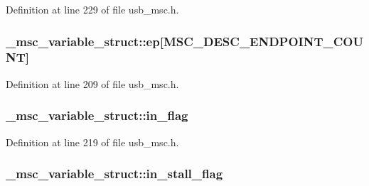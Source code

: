 Definition at line 229 of file usb\+\_\+msc.\+h.

\subsubsection[{\texorpdfstring{ep}{ep}}]{ \+\_\+msc\+\_\+variable\+\_\+struct\+::ep\mbox{[}{\bf M\+S\+C\+\_\+\+D\+E\+S\+C\+\_\+\+E\+N\+D\+P\+O\+I\+N\+T\+\_\+\+C\+O\+U\+NT}\mbox{]}}\hypertarget{struct__msc__variable__struct_acaa951b403a7dfb61afb5342b907f4e3}{}\label{struct__msc__variable__struct_acaa951b403a7dfb61afb5342b907f4e3}


Definition at line 209 of file usb\+\_\+msc.\+h.

\subsubsection[{\texorpdfstring{in\+\_\+flag}{in_flag}}]{ \+\_\+msc\+\_\+variable\+\_\+struct\+::in\+\_\+flag}\hypertarget{struct__msc__variable__struct_af4f7f5d0f14889d5bbb0a23a341e406b}{}\label{struct__msc__variable__struct_af4f7f5d0f14889d5bbb0a23a341e406b}


Definition at line 219 of file usb\+\_\+msc.\+h.

\subsubsection[{\texorpdfstring{in\+\_\+stall\+\_\+flag}{in_stall_flag}}]{ \+\_\+msc\+\_\+variable\+\_\+struct\+::in\+\_\+stall\+\_\+flag}\hypertarget{struct__msc__variable__struct_aaef832f554e060e676fb9a7569c46a7b}{}\label{struct__msc__variable__struct_aaef832f554e060e676fb9a7569c46a7b}


